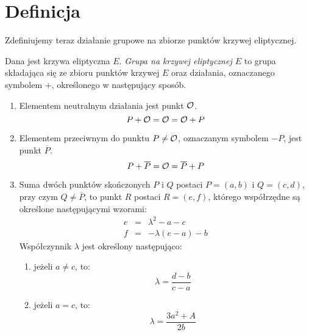 \section{Definicja}

\noindent
Zdefiniujemy teraz działanie grupowe na zbiorze punktów krzywej eliptycznej.

\begin{definition}\label{ec_groupop_def}
Dana jest krzywa eliptyczna $E$.
\emph{Grupa na krzywej eliptycznej $E$}
to grupa składająca się
ze zbioru punktów krzywej $E$
oraz działania, oznaczanego symbolem $+$,
określonego w następujący sposób.
\begin{enumerate}
\item\label{ec_groupop_neutral}
Elementem neutralnym działania jest punkt $\mathcal{O}$.
\begin{equation}
P + \mathcal{O} = \mathcal{O} = \mathcal{O} + P
\end{equation}
\item\label{ec_groupop_inverse}
Elementem przeciwnym do punktu $P \neq \mathcal{O}$,
oznaczanym symbolem $-P$,
jest punkt $\overline{P}$.
\begin{equation}
P + \overline{P} = \mathcal{O} = \overline{P} + P
\end{equation}
\item\label{ec_groupop_add_generic}
Suma dwóch punktów skończonych $P$ i $Q$
postaci $P = (a, b)$ i $Q = (c, d)$,
przy czym $Q \neq \overline{P}$,
to punkt $R$ postaci $R = (e, f)$,
którego współrzędne są określone następującymi wzorami:
\begin{eqnarray}
\label{ec_groupop_add_generic_eqn_x}
e & = & \lambda^2 - a - c \\
\label{ec_groupop_add_generic_eqn_y}
f & = & -\lambda(e - a) - b
\end{eqnarray}
Współczynnik $\lambda$ jest określony następująco:
\begin{enumerate}
\item\label{ec_groupop_add_generic_chord}
jeżeli $a \neq c$, to:
\begin{equation}\label{ec_groupop_add_generic_lambda_chord_eqn}
\lambda = \frac{d-b}{c-a}
\end{equation}
\item\label{ec_groupop_add_generic_tangent}
jeżeli $a = c$, to:
\begin{equation}\label{ec_groupop_add_generic_lambda_tangent_eqn}
\lambda = \frac{3a^2+A}{2b}
\end{equation}
\end{enumerate}
\end{enumerate}
\end{definition}

